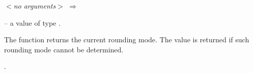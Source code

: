 \documentclass[../Rounding.tex]{subfiles}
\begin{document}

\DSyntax{}

 \textit{$<$no arguments$>$}
$\Rightarrow$ 

\DArgsNValues{}

 -- a value of type .

\DDescription{}

The function returns the current rounding mode.  The value
 is returned if such rounding mode cannot be
determined.

\DSeeAlso{}

.
\end{document}
